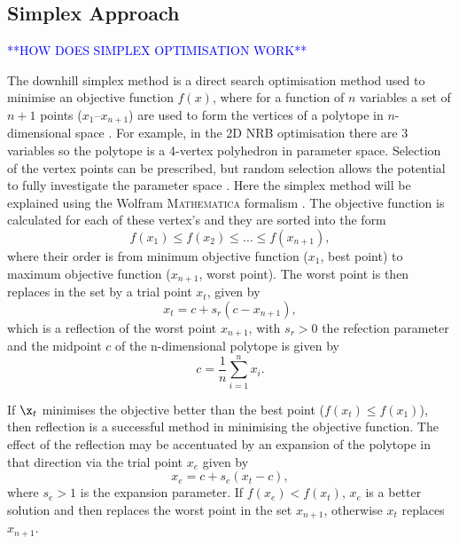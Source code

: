 \documentclass[../main.tex]{subfiles}
\begin{document}
\subsection{Simplex Approach}
\label{sec:simplex_optimisation}
\textcolor{blue}{**HOW DOES SIMPLEX OPTIMISATION WORK**}

The downhill simplex method is a direct search optimisation method used to minimise an objective function $f\left(x\right)$, where for a function of $n$ variables a set of $n+1$ points ($x_{1}$--$x_{n+1}$) are used to form the vertices of a polytope in $n$-dimensional space \cite{wolfram2021nmaximize}. For example, in the 2D NRB optimisation there are 3 variables so the polytope is a 4-vertex polyhedron in parameter space. Selection of
the vertex points can be prescribed, but random selection allows the potential to fully investigate the parameter space \cite{koshel2002enhancement}. Here the simplex method will be explained using the Wolfram \textsc{Mathematica} formalism \cite{wolfram2021nmaximize}. The objective function is calculated for each of these vertex's and they are sorted into the form
\begin{equation}
f\left(x_{1}\right) \leq f\left(x_{2}\right) \leq \ldots \leq f\left(x_{n+1}\right),
\label{eq:simplex_polytope_objective_functions}
\end{equation}
where their order is from minimum objective function ($x_{1}$, best point) to maximum objective function ($x_{n+1}$, worst point). The worst point is then replaces in the set by a trial point $x_{t}$, given by
\begin{equation}
x_{t} = c+s_{r}\left(c-x_{n+1}\right),
\label{eq:simplex_trial_point}    
\end{equation}
which is a reflection of the worst point $x_{n+1}$, with $s_{r} > 0$ the refection parameter and the midpoint $c$ of the n-dimensional polytope is given by
\begin{equation}
c = \frac{1}{n}\sum_{i=1}^{n}x_{i}.
\label{eq:polytope_centroid_simplex}
\end{equation}

If $\x_{t}$ minimises the objective better than the best point ($f\left(x_{t}\right) \leq f\left(x_{1}\right)$), then reflection is a successful method in minimising the objective function. The effect of the reflection may be accentuated by an expansion of the polytope in that direction via the trial point $x_{e}$ given by
\begin{equation}
x_{e} = c+s_{e}\left(x_{t}-c\right),
\label{eq:simplex_expansion}    
\end{equation}
where $s_{e} > 1$ is the expansion parameter. If $f\left(x_{e}\right) < f\left(x_{t}\right)$, $x_{e}$ is a better solution and then replaces the worst point in the set $x_{n+1}$, otherwise $x_{t}$ replaces $x_{n+1}$. 
\end{document}

